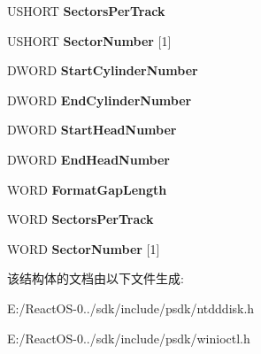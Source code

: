 \begin{DoxyCompactItemize}
U\+S\+H\+O\+RT {\bfseries Sectors\+Per\+Track}
\item 
\mbox{\label{struct___f_o_r_m_a_t___e_x___p_a_r_a_m_e_t_e_r_s_aa46f1e91062c7de0a4535943d0649c4c}} 
U\+S\+H\+O\+RT {\bfseries Sector\+Number} \mbox{[}1\mbox{]}
\item 
\mbox{\label{struct___f_o_r_m_a_t___e_x___p_a_r_a_m_e_t_e_r_s_a8b1826ea33ba5f3bbf8d47a94958b2f7}} 
D\+W\+O\+RD {\bfseries Start\+Cylinder\+Number}
\item 
\mbox{\label{struct___f_o_r_m_a_t___e_x___p_a_r_a_m_e_t_e_r_s_a763adb61e7892fd484ec1c0fe2a73267}} 
D\+W\+O\+RD {\bfseries End\+Cylinder\+Number}
\item 
\mbox{\label{struct___f_o_r_m_a_t___e_x___p_a_r_a_m_e_t_e_r_s_a6c5a197a4fa15c71353bddcb9da69d8e}} 
D\+W\+O\+RD {\bfseries Start\+Head\+Number}
\item 
\mbox{\label{struct___f_o_r_m_a_t___e_x___p_a_r_a_m_e_t_e_r_s_a381960b947e703e81886a32d361084ba}} 
D\+W\+O\+RD {\bfseries End\+Head\+Number}
\item 
\mbox{\label{struct___f_o_r_m_a_t___e_x___p_a_r_a_m_e_t_e_r_s_aab67207e890aa00d8bea80c5a44e182a}} 
W\+O\+RD {\bfseries Format\+Gap\+Length}
\item 
\mbox{\label{struct___f_o_r_m_a_t___e_x___p_a_r_a_m_e_t_e_r_s_a252021f05e32ea36dd9d1a04d2a0f4e7}} 
W\+O\+RD {\bfseries Sectors\+Per\+Track}
\item 
\mbox{\label{struct___f_o_r_m_a_t___e_x___p_a_r_a_m_e_t_e_r_s_add1cbda17f9580f28798c1f6517a74ce}} 
W\+O\+RD {\bfseries Sector\+Number} \mbox{[}1\mbox{]}
\end{DoxyCompactItemize}


该结构体的文档由以下文件生成\+:\begin{DoxyCompactItemize}
\item 
E\+:/\+React\+O\+S-\/0../sdk/include/psdk/ntdddisk.\+h\item 
E\+:/\+React\+O\+S-\/0../sdk/include/psdk/winioctl.\+h\end{DoxyCompactItemize}

